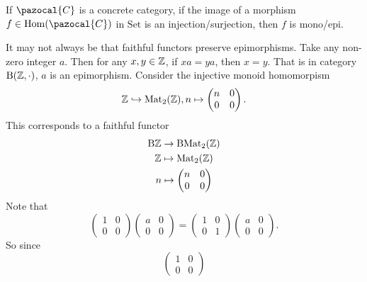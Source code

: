     \begin{corollary}
        If $\pazocal{C}$ is a concrete category, if the image of a morphism $f\in \Hom(\pazocal{C})$ in $\mathrm{Set}$ is an injection/surjection, then $f$ is mono/epi. 
    \end{corollary}
    \begin{example}
        It may not always be that faithful functors preserve epimorphisms. Take any non-zero integer $a$. Then for any $x,y\in\Z$, if $xa = ya$, then $x=y$. That is in category $\mathrm{B}(\Z,\cdot)$, $a$ is an epimorphism. Consider the injective monoid homomorpism 
        $$
        \Z \hookrightarrow \mathrm{Mat}_2(\Z), n \mapsto \begin{pmatrix}
            n & 0 \\
            0 & 0
        \end{pmatrix}.
        $$
        This corresponds to a faithful functor 
        \begin{gather*}
            \mathrm{B}\mathbb{Z} \rightarrow \mathrm{B}\mathrm{Mat}_2(\mathbb{Z})\\
            \mathbb{Z} \mapsto \mathrm{Mat}_2(\mathbb{Z})\\
            n \mapsto \begin{pmatrix}
            n & 0 \\
            0 & 0
        \end{pmatrix}
        \end{gather*}
        Note that 
        $$
            \begin{pmatrix}
                1 & 0 \\
                0 & 0
            \end{pmatrix}
            \begin{pmatrix}
                a & 0\\
                0 & 0  
            \end{pmatrix}
            = 
            \begin{pmatrix}
                1 & 0\\
                0 & 1
            \end{pmatrix}
            \begin{pmatrix}
                a & 0\\
                0 & 0  
            \end{pmatrix}.
        $$
        So since 
        $$
            \begin{pmatrix}
                1 & 0 \\
                0 & 0

\end{pmatrix}$$
\end{example}
